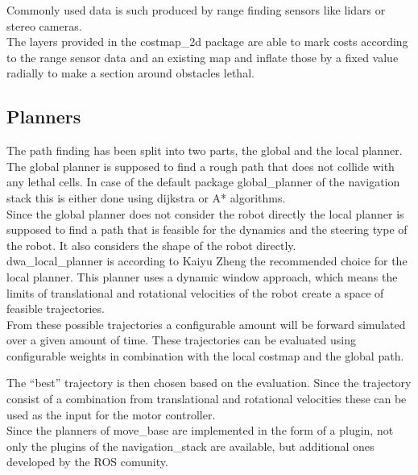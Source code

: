 Commonly used data is such produced by range finding sensors like lidars or stereo cameras.\\

The layers provided in the costmap\_2d package are able to mark costs according to the range sensor data and an existing map and inflate those by a fixed value radially\cite{costmap} to make a section around obstacles lethal.

\subsection{Planners}

The path finding has been split into two parts, the global and the local planner.\\

The global planner is supposed to find a rough path that does not collide with any lethal cells. In case of the default package global\_planner of the navigation stack this is either done using dijkstra or A* algorithms.\\

Since the global planner does not consider the robot directly the local planner is supposed to find a path that is feasible for the dynamics and the steering type of the robot. It also considers the shape of the robot directly\cite{movebase}.\\



dwa\_local\_planner is according to Kaiyu Zheng the recommended choice for the local planner\cite{navtuningguide}. This planner uses a dynamic window approach, which means the limits of translational and rotational velocities of the robot create a space of feasible trajectories.\\ 
From these possible trajectories a configurable amount will be forward simulated over a given amount of time. These trajectories can be evaluated using configurable weights in combination with the local costmap and the global path.

The ``best'' trajectory is then chosen based on the evaluation. Since the trajectory consist of a combination from translational and rotational velocities these can be used as the input for the motor controller\cite{dwaplanner}.\\

Since the planners of move\_base are implemented in the form of a plugin, not only the plugins of the navigation\_stack are available, but additional ones developed by the ROS comunity.

